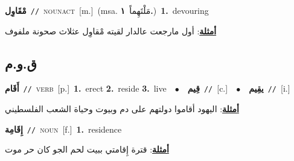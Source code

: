 \documentclass[10pt,a4paper,twoside]{article} %
\begin{document}
\begin{multicols}{2}
{\setlength\topsep{0pt}\textbf{\foreignlanguage{arabic}{مْقَاوِل}}\ {\color{gray}\texttt{//}\color{black}}\ \textsc{noun\textunderscore act}\ [m.]\ \color{gray}(msa. \foreignlanguage{arabic}{مَلْتَهِماً}~\foreignlanguage{arabic}{\textbf{١.}})\color{black}\ \textbf{1.}~devouring\  \begin{flushright}\color{gray}\foreignlanguage{arabic}{\textbf{\underline{\foreignlanguage{arabic}{أمثلة}}}: أول مارجعت عالدار لقيته مْقاوِل عثلاث صحونة ملفوف}\end{flushright}\color{black}} \vspace{2mm}

\vspace{-3mm}
\subsection*{\color{blue}\foreignlanguage{arabic}{ق.و.م}\color{blue}{}} 

{\setlength\topsep{0pt}\textbf{\foreignlanguage{arabic}{أَقَام}}\ {\color{gray}\texttt{//}\color{black}}\ \textsc{verb}\ [p.]\ \textbf{1.}~erect  \textbf{2.}~reside  \textbf{3.}~live\ \ $\bullet$\ \ \setlength\topsep{0pt}\textbf{\foreignlanguage{arabic}{قِيم}}\ {\color{gray}\texttt{//}\color{black}}\ [c.]\ \ $\bullet$\ \ \setlength\topsep{0pt}\textbf{\foreignlanguage{arabic}{يقِيم}}\ {\color{gray}\texttt{//}\color{black}}\ [i.]\  \begin{flushright}\color{gray}\foreignlanguage{arabic}{\textbf{\underline{\foreignlanguage{arabic}{أمثلة}}}: اليهود أقاموا دولتهم على دم وبيوت وحياة الشعب الفلسطيني}\end{flushright}\color{black}} \vspace{2mm}

{\setlength\topsep{0pt}\textbf{\foreignlanguage{arabic}{إِقَامِة}}\ {\color{gray}\texttt{//}\color{black}}\ \textsc{noun}\ [f.]\ \textbf{1.}~residence\  \begin{flushright}\color{gray}\foreignlanguage{arabic}{\textbf{\underline{\foreignlanguage{arabic}{أمثلة}}}: قترة إِقامتي ببيت لحم الجو كان حر موت}\end{flushright}\color{black}} \vspace{2mm}


\end{multicols}
\end{document}
